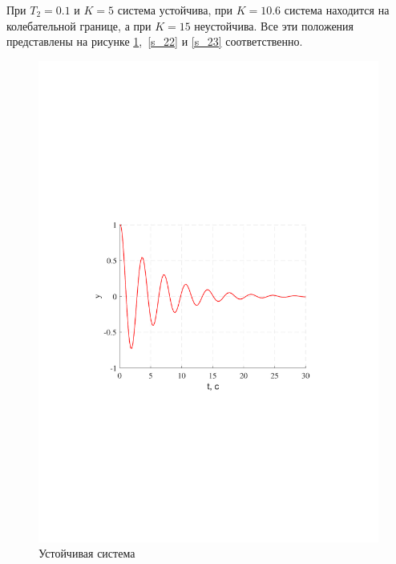 \documentclass[a4paper,12pt]{article}
\begin{document}
	При $T_2=0.1$ и $K=5$ система устойчива, при $K=10.6$ система находится на колебательной границе, а при $K=15$ неустойчива. Все эти положения представлены на рисунке \ref{s_21},~\ref{s_22} и \ref{s_23} соответственно.
	\begin{figure}[h!]
		\centering
			\includegraphics[width=6in]{UstoichivayaMOD.pdf}
			\caption{Устойчивая система}
			\label{s_21}
		\end{figure}
	\newpage			
\end{document}
